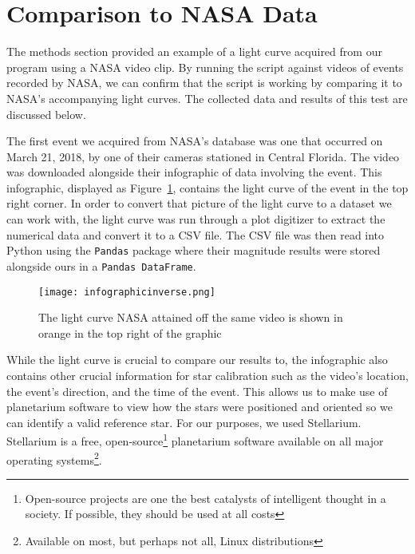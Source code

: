 \section{Comparison to NASA Data}

The methods section provided an example of a light curve acquired from our program using a NASA video clip. By running the script against videos of events recorded by NASA, we can confirm that the script is working by comparing it to NASA's accompanying light curves. The collected data and results of this test are discussed below.

The first event we acquired from NASA's database was one that occurred on March 21, 2018, by one of their cameras stationed in Central Florida. The video was downloaded alongside their infographic of data involving the event. This infographic, displayed as Figure~\ref{fig:infographic}, contains the light curve of the event in the top right corner. In order to convert that picture of the light curve to a dataset we can work with, the light curve was run through a plot digitizer to extract the numerical data and convert it to a CSV file. The CSV file was then read into Python using the \texttt{Pandas} package where their magnitude results were stored alongside ours in a \texttt{Pandas DataFrame}.

\begin{figure}[ht!]
	\centering
	\texttt{[image: infographicinverse.png]}
	\caption{The light curve NASA attained off the same video is shown in orange in the top right of the graphic\protect\cite{NASA2018}}
	\label{fig:infographic}
\end{figure}

While the light curve is crucial to compare our results to, the infographic also contains other crucial information for star calibration such as the video's location, the event's direction, and the time of the event. This allows us to make use of planetarium software to view how the stars were positioned and oriented so we can identify a valid reference star. For our purposes, we used Stellarium. Stellarium is a free, open-source\footnote{Open-source projects are one the best catalysts of intelligent thought in a society. If possible, they should be used at all costs} planetarium software available on all major operating systems\footnote{Available on most, but perhaps not all, Linux distributions}.

